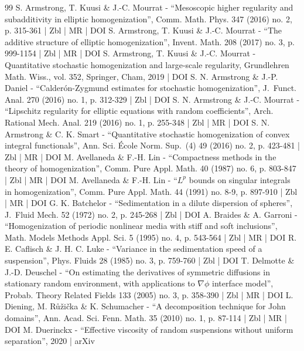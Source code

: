 \documentclass[10pt]{amsart}
\theoremstyle{plain}
\theoremstyle{definition}
\begin{document}
\begin{thebibliography}{99}
S. Armstrong, T. Kuusi \& J.-C. Mourrat - “Mesoscopic higher regularity and subadditivity in elliptic homogenization”, Comm. Math. Phys. 347 (2016) no. 2, p. 315-361 | Zbl | MR | DOI
S. Armstrong, T. Kuusi \& J.-C. Mourrat - “The additive structure of elliptic homogenization”, Invent. Math. 208 (2017) no. 3, p. 999-1154 | Zbl | MR | DOI
S. Armstrong, T. Kuusi \& J.-C. Mourrat - Quantitative stochastic homogenization and large-scale regularity, Grundlehren Math. Wiss., vol. 352, Springer, Cham, 2019 | DOI
S. N. Armstrong \& J.-P. Daniel - “Calderón-Zygmund estimates for stochastic homogenization”, J. Funct. Anal. 270 (2016) no. 1, p. 312-329 | Zbl | DOI
S. N. Armstrong \& J.-C. Mourrat - “Lipschitz regularity for elliptic equations with random coefficients”, Arch. Rational Mech. Anal. 219 (2016) no. 1, p. 255-348 | Zbl | MR | DOI
S. N. Armstrong \& C. K. Smart - “Quantitative stochastic homogenization of convex integral functionals”, Ann. Sci. École Norm. Sup. (4) 49 (2016) no. 2, p. 423-481 | Zbl | MR | DOI
M. Avellaneda \& F.-H. Lin - “Compactness methods in the theory of homogenization”, Comm. Pure Appl. Math. 40 (1987) no. 6, p. 803-847 | Zbl | MR | DOI
M. Avellaneda \& F.-H. Lin - “$L^p$ bounds on singular integrals in homogenization”, Comm. Pure Appl. Math. 44 (1991) no. 8-9, p. 897-910 | Zbl | MR | DOI
G. K. Batchelor - “Sedimentation in a dilute dispersion of spheres”, J. Fluid Mech. 52 (1972) no. 2, p. 245-268 | Zbl | DOI
A. Braides \& A. Garroni - “Homogenization of periodic nonlinear media with stiff and soft inclusions”, Math. Models Methods Appl. Sci. 5 (1995) no. 4, p. 543-564 | Zbl | MR | DOI
R. E. Caflisch \& J. H. C. Luke - “Variance in the sedimentation speed of a suspension”, Phys. Fluids 28 (1985) no. 3, p. 759-760 | Zbl | DOI
T. Delmotte \& J.-D. Deuschel - “On estimating the derivatives of symmetric diffusions in stationary random environment, with applications to $\nabla \phi $ interface model”, Probab. Theory Related Fields 133 (2005) no. 3, p. 358-390 | Zbl | MR | DOI
L. Diening, M. Růžička \& K. Schumacher - “A decomposition technique for John domains”, Ann. Acad. Sci. Fenn. Math. 35 (2010) no. 1, p. 87-114 | Zbl | MR | DOI
M. Duerinckx - “Effective viscosity of random suspensions without uniform separation”, 2020 | arXiv

\end{thebibliography}
\end{document}
